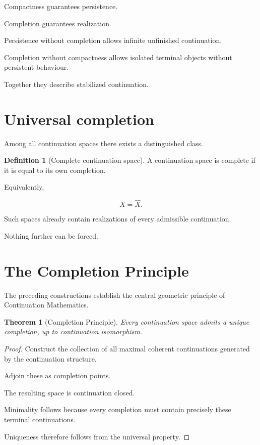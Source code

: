 \documentclass[13pt,openany]{book}
\theoremstyle{plain}
\newtheorem{theorem}{Theorem}[chapter]
\theoremstyle{definition}
\newtheorem{definition}{Definition}[chapter]
\begin{document}
Compactness guarantees persistence.

Completion guarantees realization.

Persistence without completion allows infinite unfinished continuation.

Completion without compactness allows isolated terminal objects without
persistent behaviour.

Together they describe stabilized continuation.

\section{Universal completion}

Among all continuation spaces there exists a distinguished class.

\begin{definition}[Complete continuation space]
A continuation space is complete if it is equal to its own completion.
\end{definition}

Equivalently,

\[
X=\widehat X.
\]

Such spaces already contain realizations of every admissible continuation.

Nothing further can be forced.

\section{The Completion Principle}

The preceding constructions establish the central geometric principle of
Continuation Mathematics.

\begin{theorem}[Completion Principle]
Every continuation space admits a unique completion, up to continuation
isomorphism.
\end{theorem}

\begin{proof}
Construct the collection of all maximal coherent continuations generated by
the continuation structure.

Adjoin these as completion points.

The resulting space is continuation closed.

Minimality follows because every completion must contain precisely these
terminal continuations.

Uniqueness therefore follows from the universal property.
\end{proof}
\end{document}
